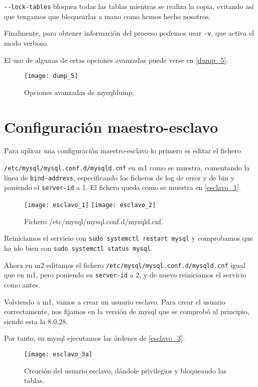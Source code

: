 \verb|--lock-tables| bloquea todas las tablas mientras se realiza la copia, evitando así que tengamos que bloquearlas a mano como hemos hecho nosotros.

Finalmente, para obtener información del proceso podemos usar \verb|-v|, que activa el modo verboso.

El uso de algunas de estas opciones avanzadas puede verse en \eqref{dump_5}.

\begin{figure}[h!]
\begin{center}
\caption{Opciones avanzadas de mysqldump.}
\label{dump_5}
\texttt{[image: dump\_5]}
\end{center}
\end{figure}

\chapter{Configuración maestro-esclavo}

Para aplicar una configuración maestro-esclavo lo primero es editar el fichero

\verb|/etc/mysql/mysql.conf.d/mysqld.cnf| en m1 como se muestra, comentando la línea de \verb|bind-address|, especificando los ficheros de log de error y de bin y poniendo el \verb|server-id| a 1. El fichero queda como se muestra en \eqref{esclavo_1}.

\begin{figure}[h!]
\begin{center}
\caption{Fichero /etc/mysql/mysql.conf.d/mysqld.cnf.}
\label{esclavo_1}
\texttt{[image: esclavo\_1]}
\texttt{[image: esclavo\_2]}
\end{center}
\end{figure}

Reiniciamos el servicio con \verb|sudo systemctl restart mysql| y comprobamos que ha ido bien con \verb|sudo systemctl status mysql|.

Ahora en m2 editamos el fichero \verb|/etc/mysql/mysql.conf.d/mysqld.cnf| igual que en m1, pero poniendo su \verb|server-id| a 2, y de nuevo reiniciamos el servicio como antes.

Volviendo a m1, vamos a crear un usuario esclavo. Para crear el usuario correctamente, nos fijamos en la versión de mysql que se comprobó al principio, siendo esta la 8.0.28.

Por tanto, en mysql ejecutamos las órdenes de \eqref{esclavo_3}.

\begin{figure}[h!]
\begin{center}
\caption{Creación del usuario esclavo, dándole privilegios y bloqueando las tablas.}
\label{esclavo_3}
\texttt{[image: esclavo\_3a]}
\end{center}
\end{figure}

